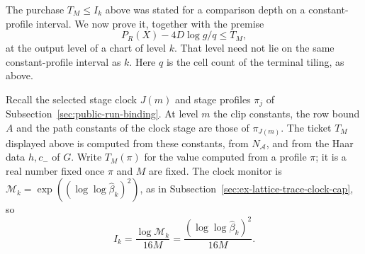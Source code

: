 The purchase $T_M\le I_k$ above was stated for a comparison depth on a
constant-profile interval. We now prove it, together with the premise
\begin{equation}\label{eq:rank-root-premise}
 P_R(X)-4D\log g/q\le T_M ,
\end{equation}
at the output level of a chart of level $k$. That level need not lie on
the same constant-profile interval as $k$. Here $q$ is the cell count of
the terminal tiling, as above.

Recall the selected stage clock $J(m)$ and stage profiles $\pi_j$ of
Subsection~\ref{sec:public-run-binding}. At level $m$ the clip constants,
the row bound $A$ and the path constants of the clock stage are those of
$\pi_{J(m)}$. The ticket $T_M$ displayed above is computed from these
constants, from $N_{\mathcal A}$, and from the Haar data $h,c_-$ of $G$.
Write $T_M(\pi)$ for the value computed from a profile $\pi$; it is a
real number fixed once $\pi$ and $M$ are fixed. The clock monitor is
$\mathcal M_k=\exp((\log\log\widehat\beta_k)^2)$, as in
Subsection~\ref{sec:ex-lattice-trace-clock-cap}, so
\[
 I_k=\frac{\log\mathcal M_k}{16M}=\frac{(\log\log\widehat\beta_k)^2}{16M}.
\]

